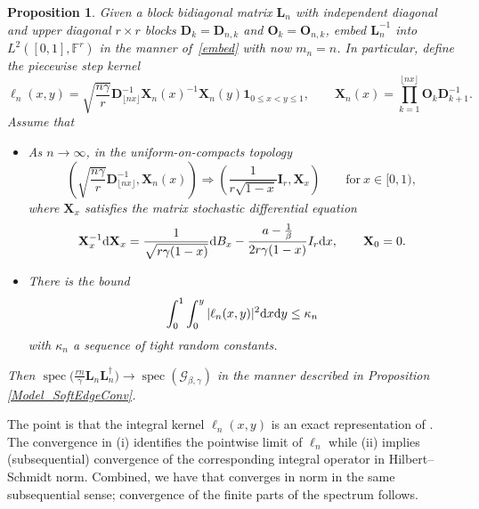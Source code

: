 \documentclass[pdftex]{sigma}
\numberwithin{equation}{section}
\newtheorem{Proposition}[Theorem]{Proposition}
\theoremstyle{definition}
\newcommand{\mbf}[1]{\mathbf{#1}}
\begin{document}
\begin{Proposition}\label{prop:hard_lim}
Given a block bidiagonal matrix $\mbf{L}_n$ with independent diagonal and upper diagonal $r \times r$ blocks $\mbf{D}_k=\mbf{D}_{n,k}$ and $\mbf{O}_k=\mbf{O}_{n,k}$, embed $ \mbf{ L}_n^{-1}$ into $L^2([0,1], \mathbb{F}^r)$
in the manner of~\eqref{embed} with now $m_n = n$. In particular,
define the piecewise step kernel
\begin{equation*}
\label{explicit_inv}
 \ell_{n}(x,y) = \sqrt{ \frac{ {n} \gamma}{r}}
 {\mbf{D}}_{\lfloor nx \rfloor}^{-1}
 {\mbf{X}}_n(x)^{-1} \mbf{X}_n(y) \mathbf{1}_{0 \le x < y \le 1},
 \qquad
 {\mbf{X}}_n(x) = \prod_{k= 1}^{ \lfloor nx \rfloor}
 {\mbf{O}}_k {\mbf{D}}_{k+1}^{-1}.
\end{equation*}
Assume that
\begin{itemize}\itemsep=0pt
\item[$(i)$] As $n \rightarrow \infty$, in the uniform-on-compacts topology
\[
 \left( \sqrt{\frac{{n} \gamma}{r}} \mbf{D}_{\lfloor nx \rfloor}^{-1}, \mbf{X}_n(x) \right) \Rightarrow
 \left( \frac{1}{r \sqrt{ 1-x}} \mbf{I}_r, \mbf{X}_x \right) \qquad
\text{for} \ x\in [0,1),
\]
where $\mbf{X}_x$ satisfies the matrix stochastic differential equation
\[
 \mbf{X}_x^{-1} {\rm d}\mbf{X}_x = \frac{1}{\sqrt{r \gamma (1-x)}} {\rm d} B_x - \frac{a -\frac{1}{ \beta}}{2 r\gamma (1- x)} {I}_r{\rm d}x, \qquad \mbf{X}_0=0.
\]


\item[$(ii)$] There is the bound
\[
 \int_0^1 \int_0^y | \ell_n(x,y) |^2 {\rm d}x {\rm d}y \le \kappa_n
\]
with $\kappa_n$ a sequence of tight random constants.
\end{itemize}
Then $\operatorname{spec}\bigl( \frac{rn}{ \gamma} \mbf{L}_n \mbf{L}_n^\dagger\bigr) \rightarrow \operatorname{spec}(\mathcal{G}_{\beta, \gamma})$ in the manner described in Proposition {\rm\ref{Model_SoftEdgeConv}}.
\end{Proposition}

The point is that the integral kernel $\ell_n(x,y)$ is an exact representation of \smash{$\bigl(\sqrt{rn / \gamma} \mbf{L}_n\bigr)^{-1}$}.
The convergence in (i) identifies the pointwise limit of $\ell_n$ while (ii) implies (subsequential) convergence of the corresponding integral operator in Hilbert--Schmidt norm.
 Combined, we have that \smash{$ \bigl(\frac{rn}{ \gamma} \mbf{L}_n \mbf{L}_n^{\dagger}\bigr)^{-1}$} converges in norm in the same subsequential
sense; convergence of the finite parts of the spectrum follows.
\end{document}
